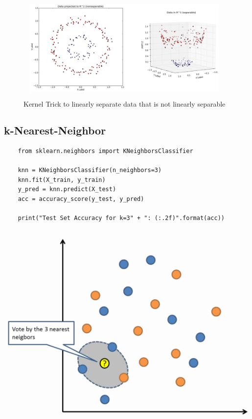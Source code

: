 \documentclass[a4paper, 11pt]{article}
\begin{document}
\begin{figure}[htb!]
    \centering
    \includegraphics[keepaspectratio=true,height=11\baselineskip]{kernel_trick.png}
    \caption{Kernel Trick to linearly separate data that is not linearly separable}
    \label{fig:kernel_trick}
\end{figure}

\subsection{k-Nearest-Neighbor}

\begin{minipage}{0.55\textwidth}
    \begin{lstlisting}
    from sklearn.neighbors import KNeighborsClassifier

    knn = KNeighborsClassifier(n_neighbors=3)
    knn.fit(X_train, y_train)
    y_pred = knn.predict(X_test)
    acc = accuracy_score(y_test, y_pred)

    print("Test Set Accuracy for k=3" + ": (:.2f)".format(acc))
    \end{lstlisting}
\end{minipage}\hfill
\begin{minipage}{0.40\textwidth}
    \centering
    \includegraphics[keepaspectratio=true, width=\textwidth]{knn.png}
\end{minipage}    
\end{document}
